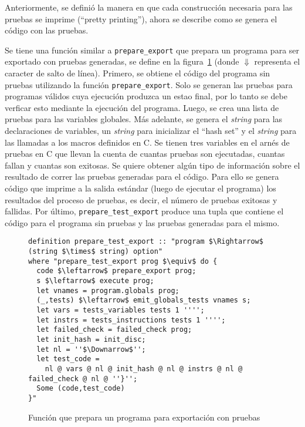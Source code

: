 Anteriormente, se definió la manera en que cada construcción necesaria para las pruebas se imprime (``pretty printing''), ahora se describe como se genera el código con las pruebas.

Se tiene una función similar a \verb|prepare_export| que prepara un programa para ser exportado con pruebas generadas, se define en la figura~\ref{fig:prepare_test_export} (donde $\Downarrow$ representa el caracter de salto de línea).
Primero, se obtiene el código del programa sin pruebas utilizando la función \verb|prepare_export|.
Solo se generan las pruebas para programas válidos cuya ejecución produzca un estao final, por lo tanto se debe verficar esto mediante la ejecución del programa.
Luego, se crea una lista de pruebas para las variables globales.
Más adelante, se genera el \textit{string} para las declaraciones de variables, un \textit{string} para inicializar el ``hash set'' y el \textit{string} para las llamadas a los macros definidos en C.
Se tienen tres variables en el arnés de pruebas en C que llevan la cuenta de cuantas pruebas son ejecutadas, cuantas fallan y cuantas son exitosas.
Se quiere obtener algún tipo de información sobre el resultado de correr las pruebas generadas para el código.
Para ello se genera código que imprime a la salida estándar (luego de ejecutar el programa) los resultados del proceso de pruebas, es decir, el número de pruebas exitosas y fallidas.
Por último, \verb|prepare_test_export| produce una tupla que contiene el código para el programa sin pruebas y las pruebas generadas para el mismo.

\begin{figure}
\begin{lstlisting}[mathescape=true]
definition prepare_test_export :: "program $\Rightarrow$ (string $\times$ string) option"
where "prepare_test_export prog $\equiv$ do {
  code $\leftarrow$ prepare_export prog;
  s $\leftarrow$ execute prog;
  let vnames = program.globals prog;
  (_,tests) $\leftarrow$ emit_globals_tests vnames s;
  let vars = tests_variables tests 1 '''';
  let instrs = tests_instructions tests 1 '''';
  let failed_check = failed_check prog;
  let init_hash = init_disc;
  let nl = ''$\Downarrow$'';
  let test_code =
    nl @ vars @ nl @ init_hash @ nl @ instrs @ nl @ failed_check @ nl @ ''}'';
  Some (code,test_code)
}"
\end{lstlisting}

\caption{Función que prepara un programa para exportación con pruebas}
\label{fig:prepare_test_export}
\end{figure}


